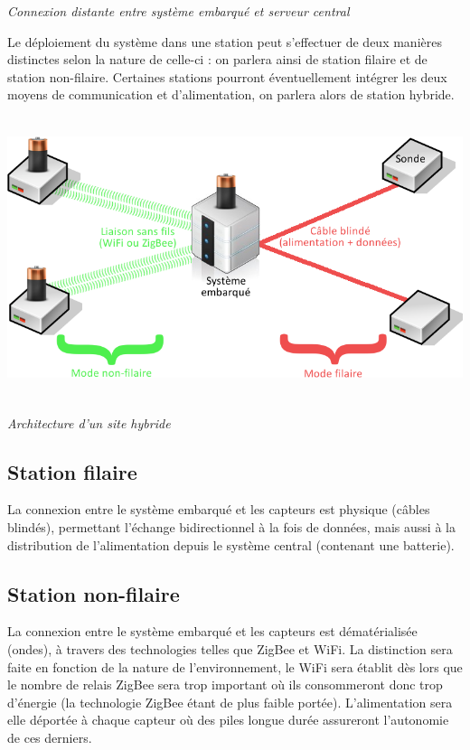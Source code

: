 \documentclass{mise_en_page}
\begin{document}
\textit{Connexion distante entre système embarqué et serveur central}

Le déploiement du système dans une station peut s’effectuer de deux
manières distinctes selon la nature de celle-ci : on parlera ainsi de
station filaire et de station non-filaire. Certaines stations pourront
éventuellement intégrer les deux moyens de communication et
d’alimentation, on parlera alors de station hybride.

 \includegraphics[width=15.505cm,height=8.229cm]{STB-img2.png}

\textit{Architecture d’un site hybride}

\subsection{Station filaire}

La connexion entre le système embarqué et les capteurs est physique
(câbles blindés), permettant l’échange bidirectionnel à la fois de
données, mais aussi à la distribution de l’alimentation depuis le
système central (contenant une batterie).

\subsection{Station non-filaire}

La connexion entre le système embarqué et les capteurs est
dématérialisée (ondes), à travers des technologies telles que ZigBee et
WiFi. La distinction sera faite en fonction de la nature de
l’environnement, le WiFi sera établit dès lors que le nombre de relais
ZigBee sera trop important où ils consommeront donc trop d’énergie (la
technologie ZigBee étant de plus faible portée). L’alimentation sera
elle déportée à chaque capteur où des piles longue durée assureront
l’autonomie de ces derniers.
\end{document}
